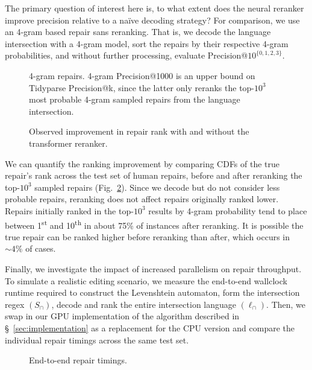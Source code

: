 \documentclass[sigplan,review,acmsmall,nonacm,screen,anonymous]{acmart}\settopmatter{printfolios=false,printccs=false,printacmref=false}
\begin{document}
The primary question of interest here is, to what extent does the neural reranker improve precision relative to a na\"ive decoding strategy? For comparison, we use an 4-gram based repair sans reranking. That is, we decode the language intersection with a 4-gram model, sort the repairs by their respective 4-gram probabilities, and without further processing, evaluate Precision@$10^{\{0, 1, 2, 3\}}$.\vspace{-0.2cm}
\begin{figure}[H]
\resizebox{.24\textwidth}{!}{}
\resizebox{.24\textwidth}{!}{}
\resizebox{.24\textwidth}{!}{}
\resizebox{.24\textwidth}{!}{}
\caption{4-gram repairs. 4-gram Precision@1000 is an upper bound on Tidyparse Precision@k, since the latter only reranks the top-$10^3$ most probable 4-gram sampled repairs from the language intersection.}\label{fig:adaptive}
\end{figure}\vspace{-0.2cm}

\begin{figure}
\vspace{-0.35cm}
%
%
\resizebox{.45\textwidth}{!}{}
\vspace{-0.8cm}
\caption{Observed improvement in repair rank with and without the transformer reranker.}
\label{fig:rank_cdf}
\vspace{-0.3cm}
\end{figure}

We can quantify the ranking improvement by comparing CDFs of the true repair's rank across the test set of human repairs, before and after reranking the top-$10^3$ sampled repairs (Fig.~\ref{fig:rank_cdf}). Since we decode but do not consider less probable repairs, reranking does not affect repairs originally ranked lower. Repairs initially ranked in the top-$10^3$ results by 4-gram probability tend to place between 1\textsuperscript{st} and 10\textsuperscript{th} in about 75\% of instances after reranking. It is possible the true repair can be ranked higher before reranking than after, which occurs in $\sim4\%$ of cases.

Finally, we investigate the impact of increased parallelism on repair throughput. To simulate a realistic editing scenario, we measure the end-to-end wallclock runtime required to construct the Levenshtein automaton, form the intersection regex $(S_\cap)$, decode and rank the entire intersection language $(\ell_\cap)$. Then, we swap in our GPU implementation of the algorithm described in \S~\ref{sec:implementation} as a replacement for the CPU version and compare the individual repair timings across the same test set.
\begin{figure}
\vspace{-0.2cm}
\resizebox{.38\textwidth}{!}{}
\vspace{-0.7cm}
\caption{End-to-end repair timings.}
\label{fig:timings}
\vspace{-0.3cm}
\end{figure}
\end{document}
